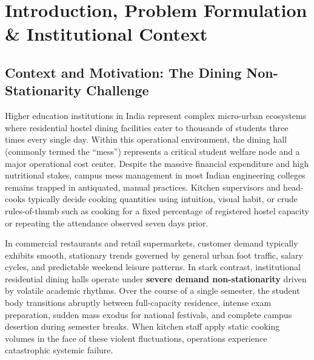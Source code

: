 \documentclass[11pt,a4paper,oneside]{report}
\begin{document}
\newpage

\tableofcontents
\newpage
\listoffigures
\newpage
\listoftables
\newpage

\setcounter{page}{1}

\chapter{Introduction, Problem Formulation \& Institutional Context}

\section{Context and Motivation: The Dining Non-Stationarity Challenge}
Higher education institutions in India represent complex micro-urban ecosystems where residential hostel dining facilities cater to thousands of students three times every single day. Within this operational environment, the dining hall (commonly termed the ``mess'') represents a critical student welfare node and a major operational cost center. Despite the massive financial expenditure and high nutritional stakes, campus mess management in most Indian engineering colleges remains trapped in antiquated, manual practices. Kitchen supervisors and head-cooks typically decide cooking quantities using intuition, visual habit, or crude rules-of-thumb such as cooking for a fixed percentage of registered hostel capacity or repeating the attendance observed seven days prior.

In commercial restaurants and retail supermarkets, customer demand typically exhibits smooth, stationary trends governed by general urban foot traffic, salary cycles, and predictable weekend leisure patterns. In stark contrast, institutional residential dining halls operate under \textbf{severe demand non-stationarity} driven by volatile academic rhythms. Over the course of a single semester, the student body transitions abruptly between full-capacity residence, intense exam preparation, sudden mass exodus for national festivals, and complete campus desertion during semester breaks. When kitchen staff apply static cooking volumes in the face of these violent fluctuations, operations experience catastrophic systemic failure.
\end{document}
